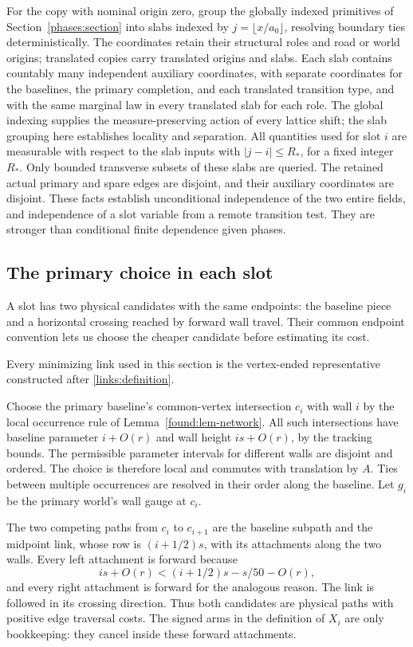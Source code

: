 For the copy with nominal origin zero, group the globally indexed
primitives of Section~\ref{phases:section} into slabs indexed by
$j=\lfloor x/a_0\rfloor$, resolving boundary ties deterministically.
The coordinates retain their structural roles and road or world origins;
translated copies carry translated origins and slabs. Each slab contains
countably many independent auxiliary coordinates, with separate
coordinates for the baselines, the primary completion, and each
translated transition type, and with the same marginal law in every
translated slab for each role. The global indexing supplies the
measure-preserving action of every lattice shift; the slab grouping
here establishes locality and separation. All quantities used for slot $i$
are measurable with respect to the slab inputs with $|j-i|\leq R_*$,
for a fixed integer $R_*$. Only bounded transverse subsets of these
slabs are queried. The retained actual primary and spare edges are
disjoint, and their auxiliary coordinates are disjoint. These facts
establish unconditional independence of the two entire fields, and
independence of a slot variable from a remote transition test. They
are stronger than conditional finite dependence given phases.

\subsection{The primary choice in each slot}
\label{improvement:primary}

A slot has two physical candidates with the same endpoints: the baseline
piece and a horizontal crossing reached by forward wall travel. Their
common endpoint convention lets us choose the cheaper candidate before
estimating its cost.

Every minimizing link used in this section is the vertex-ended
representative constructed after \eqref{links:definition}.

Choose the primary baseline's common-vertex intersection $c_i$ with
wall $i$ by the local occurrence rule of Lemma~\ref{found:lem-network}.
All such intersections have
baseline parameter $i+O(r)$ and wall height $is+O(r)$, by the tracking
bounds. The permissible parameter intervals for different walls are
disjoint and ordered. The choice is therefore local and commutes with
translation by $A$. Ties between multiple occurrences are resolved
in their order along the baseline. Let $g_i$ be the primary world's
wall gauge at $c_i$.

The two competing paths from $c_i$ to $c_{i+1}$ are the baseline
subpath and the midpoint link, whose row is $(i+1/2)s$, with its
attachments along the two walls. Every left attachment is forward
because
\[
 is+O(r)<(i+1/2)s-s/50-O(r),
\]
and every right attachment is forward for the analogous reason.
The link is followed in its crossing direction. Thus both candidates
are physical paths with positive edge traversal costs. The signed
arms in the definition of $X_i$ are only bookkeeping: they cancel
inside these forward attachments.

